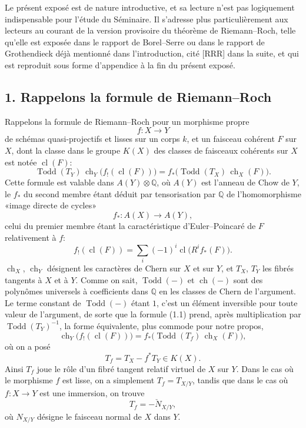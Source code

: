 \documentclass[11pt]{article}
\newcommand{\ch}{\operatorname{ch}}
\newcommand{\Todd}{\operatorname{Todd}}
\newcommand{\cl}{\operatorname{cl}}
\providecommand{\ch}{\operatorname{ch}}
\providecommand{\Todd}{\operatorname{Todd}}
\begin{document}
Le présent exposé est de nature introductive, et sa lecture n'est pas logiquement indispensable pour l'étude du Séminaire. Il s'adresse plus particulièrement aux lecteurs au courant de la version provisoire du théorème de Riemann--Roch, telle qu'elle est exposée dans le rapport de Borel--Serre ou dans le rapport de Grothendieck déjà mentionné dans l'introduction, cité [RRR] dans la suite, et qui est reproduit sous forme d'appendice à la fin du présent exposé.

\subsection*{1. Rappelons la formule de Riemann--Roch}
Rappelons la formule de Riemann--Roch pour un morphisme propre
\[
f:X\longrightarrow Y
\]
de schémas quasi-projectifs et lisses sur un corps $k$, et un faisceau cohérent $F$ sur $X$, dont la classe dans le groupe $K(X)$ des classes de faisceaux cohérents sur $X$ est notée $\cl(F)$:
\begin{equation}\tag{1.1}
\Todd(T_Y)\,\ch_Y\bigl(f_!(\cl(F))\bigr)=f_*\bigl(\Todd(T_X)\,\ch_X(F)\bigr).
\end{equation}
Cette formule est valable dans $A(Y)\otimes\mathbb Q$, où $A(Y)$ est l'anneau de Chow de $Y$, le $f_*$ du second membre étant déduit par tensorisation par $\mathbb Q$ de l'homomorphisme «image directe de cycles»
\[
f_*:A(X)\longrightarrow A(Y),
\]
celui du premier membre étant la caractéristique d'Euler--Poincaré de $F$ relativement à $f$:
\[
f_!(\cl(F))=\sum_i(-1)^i\cl\bigl(R^if_*(F)\bigr).
\]
$\ch_X$, $\ch_Y$ désignent les caractères de Chern sur $X$ et sur $Y$, et $T_X$, $T_Y$ les fibrés tangents à $X$ et à $Y$. Comme on sait, $\Todd(-)$ et $\ch(-)$ sont des polynômes universels à coefficients dans $\mathbb Q$ en les classes de Chern de l'argument. Le terme constant de $\Todd(-)$ étant $1$, c'est un élément inversible pour toute valeur de l'argument, de sorte que la formule (1.1) prend, après multiplication par $\Todd(T_Y)^{-1}$, la forme équivalente, plus commode pour notre propos,
\begin{equation}\tag{1.2}
\ch_Y\bigl(f_!(\cl(F))\bigr)=f_*\bigl(\Todd(T_f)\,\ch_X(F)\bigr),
\end{equation}
où on a posé
\begin{equation}\tag{1.3}
T_f=T_X-f^*T_Y\in K(X).
\end{equation}
Ainsi $T_f$ joue le rôle d'un fibré tangent relatif virtuel de $X$ sur $Y$. Dans le cas où le morphisme $f$ est lisse, on a simplement $T_f=T_{X/Y}$, tandis que dans le cas où $f:X\to Y$ est une immersion, on trouve
\[
T_f=-\check N_{X/Y},
\]
où $N_{X/Y}$ désigne le faisceau normal de $X$ dans $Y$.
\end{document}
